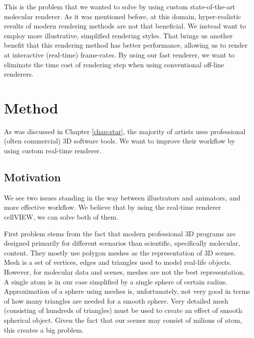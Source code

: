 \documentclass[
  digital, %
  table,   %
  nolof,     %
  nolot,     %
  oneside,
]{fithesis3}
\begin{document}
This is the problem that we wanted to solve by using custom state-of-the-art molecular renderer. As it was mentioned before, at this domain, hyper-realistic results of modern rendering methods are not that beneficial. We instead want to employ more illustrative, simplified rendering styles. That brings us another benefit that this rendering method has better performance, allowing us to render at interactive (real-time) frame-rates. By using our fast renderer, we want to eliminate the time cost of rendering step when using conventional off-line renderers.

\chapter{Method}
\label{chap:method}
As was discussed in Chapter \ref{chap:star}, the majority of artists uses professional (often commercial) 3D software tools. We want to improve their workflow by using custom real-time renderer.


\section{Motivation}
We see two issues standing in the way between illustrators and animators, and more effective workflow. We believe that by using the real-time renderer cellVIEW, we can solve both of them.

First problem stems from the fact that modern professional 3D programs are designed primarily for different scenarios than scientific, specifically molecular, content. They mostly use polygon meshes as the representation of 3D scenes. Mesh is a set of vertices, edges and triangles used to model real-life objects. However, for molecular data and scenes, meshes are not the best representation. A single atom is in our case simplified by a single sphere of certain radius. Approximation of a sphere using meshes is, unfortunately, not very good in terms of how many triangles are needed for a smooth sphere. Very detailed mesh (consisting of hundreds of triangles) must be used to create an effect of smooth spherical object. Given the fact that our scenes may consist of milions of atom, this creates a big problem.
\end{document}
